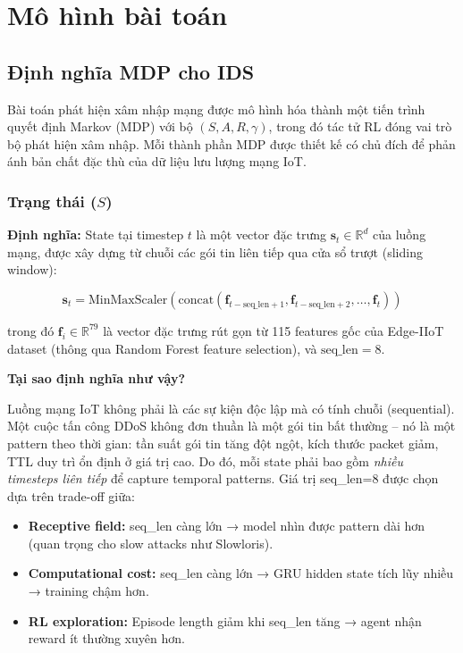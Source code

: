 \documentclass[12pt,a4paper]{article}
\begin{document}
\section{Mô hình bài toán}

\subsection{Định nghĩa MDP cho IDS}\label{sec:mdp_def}
Bài toán phát hiện xâm nhập mạng được mô hình hóa thành một tiến trình quyết định Markov (MDP) với bộ $(S, A, R, \gamma)$, trong đó tác tử RL đóng vai trò bộ phát hiện xâm nhập. Mỗi thành phần MDP được thiết kế có chủ đích để phản ánh bản chất đặc thù của dữ liệu lưu lượng mạng IoT.

\subsubsection{Trạng thái ($S$)}

\textbf{Định nghĩa:} State tại timestep $t$ là một vector đặc trưng $\mathbf{s}_t \in \mathbb{R}^{d}$ của luồng mạng, được xây dựng từ chuỗi các gói tin liên tiếp qua cửa sổ trượt (sliding window):

\begin{equation}
    \mathbf{s}_t = \text{MinMaxScaler}\left(\text{concat}\left(\mathbf{f}_{t-\text{seq\_len}+1}, \mathbf{f}_{t-\text{seq\_len}+2}, \ldots, \mathbf{f}_t\right)\right)
\end{equation}

trong đó $\mathbf{f}_i \in \mathbb{R}^{79}$ là vector đặc trưng rút gọn từ 115 features gốc của Edge-IIoT dataset (thông qua Random Forest feature selection), và $\text{seq\_len}=8$.

\textbf{Tại sao định nghĩa như vậy?}

Luồng mạng IoT không phải là các sự kiện độc lập mà có tính chuỗi (sequential). Một cuộc tấn công DDoS không đơn thuần là một gói tin bất thường -- nó là một pattern theo thời gian: tần suất gói tin tăng đột ngột, kích thước packet giảm, TTL duy trì ổn định ở giá trị cao. Do đó, mỗi state phải bao gồm \textit{nhiều timesteps liên tiếp} để capture temporal patterns. Giá trị seq\_len=8 được chọn dựa trên trade-off giữa:
\begin{itemize}
    \item \textbf{Receptive field:} seq\_len càng lớn → model nhìn được pattern dài hơn (quan trọng cho slow attacks như Slowloris).
    \item \textbf{Computational cost:} seq\_len càng lớn → GRU hidden state tích lũy nhiều → training chậm hơn.
    \item \textbf{RL exploration:} Episode length giảm khi seq\_len tăng → agent nhận reward ít thường xuyên hơn.
\end{itemize}
\end{document}
